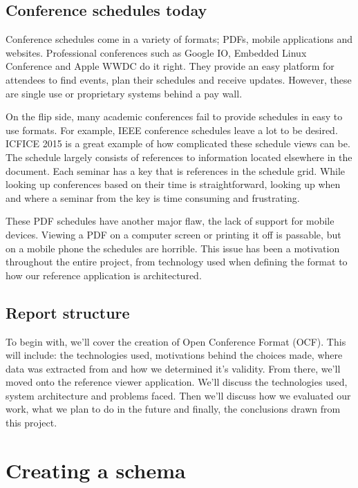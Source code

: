 \documentclass[conference]{IEEEtran}
\begin{document}
\subsection{Conference schedules today}
Conference schedules come in a variety of formats; PDFs, mobile applications and websites. Professional conferences such as Google IO\cite{googleIO2015}, Embedded Linux Conference\cite{embeddedlinuxconference2015} and Apple WWDC\cite{appleWwdc2014} do it right. They provide an easy platform for attendees to find events, plan their schedules and receive updates. However, these are single use or proprietary systems behind a pay wall.

On the flip side, many academic conferences fail to provide schedules in easy to use formats. For example, IEEE conference schedules\cite{ieeePSC2015,ieeeICC2015,ieeeIMC2014} leave a lot to be desired. ICFICE 2015\cite{icfice2015} is a great example of how complicated these schedule views can be. The schedule largely consists of references to information located elsewhere in the document. Each seminar has a key that is references in the schedule grid. While looking up conferences based on their time is straightforward, looking up when and where a seminar from the key is time consuming and frustrating.

These PDF schedules have another major flaw, the lack of support for mobile devices. Viewing a PDF on a computer screen or printing it off is passable, but on a mobile phone the schedules are horrible. This issue has been a motivation throughout the entire project, from technology used when defining the format to how our reference application is architectured.

\subsection{Report structure}
To begin with, we'll cover the creation of Open Conference Format (OCF). This will include: the technologies used, motivations behind the choices made, where data was extracted from and how we determined it's validity. From there, we'll moved onto the reference viewer application. We'll discuss the technologies used, system architecture and problems faced. Then we'll discuss how we evaluated our work, what we plan to do in the future and finally, the conclusions drawn from this project.

\section{Creating a schema}
\end{document}
